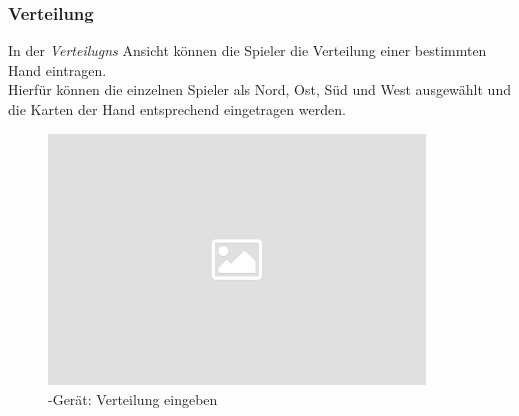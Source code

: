 \subsubsection{Verteilung}

\noindent
In der \textit{Verteilugns} Ansicht können die Spieler die Verteilung einer bestimmten Hand eintragen.\\[.1cm]

\noindent
Hierfür können die einzelnen Spieler als Nord, Ost, Süd und West ausgewählt und die Karten der Hand entsprechend eingetragen werden.\\[.1cm]

\noindent
\begin{figure}[ht]
	\centering
  \includegraphics[width=10cm]{pictures/placeholder.png}
	\caption{\cli-Gerät: Verteilung eingeben}
	\label{pic/cli_3_dist}
\end{figure}

